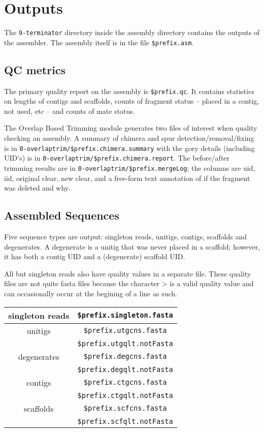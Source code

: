 \documentclass[twoside,11pt]{article}
\begin{document}
\section{Outputs}

The {\tt 9-terminator} directory inside the assembly directory
contains the outputs of the assembler.  The assembly itself is in the
file {\tt \$prefix.asm}.

\subsection{QC metrics}

The primary quality report on the assembly is {\tt \$prefix.qc}.  It
contains statistics on lengths of contigs and scaffolds, counts of
fragment status -- placed in a contig, not used, etc -- and counts of
mate status.

The Overlap Based Trimming module generates two files of interest
when quality checking an assembly.  A summary of chimera and spur
detection/removal/fixing is in {\tt 0-overlaptrim/\$prefix.chimera.summary} with the gory
details (including UID's) is in {\tt 0-overlaptrim/\$prefix.chimera.report}.  The
before/after trimming results are in {\tt 0-overlaptrim/\$prefix.mergeLog}; the columns are
uid, iid, original clear, new clear, and a free-form text annotation
of if the fragment was deleted and why.

\subsection{Assembled Sequences}

Five sequence types are output: singleton reads, unitigs, contigs,
scaffolds and degenerates.  A degenerate is a unitig that was never
placed in a scaffold; however, it has both a contig UID and a
(degenerate) scaffold UID.

All but singleton reads also have quality values in a separate file.
These quality files are not quite fasta files because the character > is a valid
quality value and can occasionally occur at the begining of a line as such.

\begin{center}
\begin{tabular}{|c|c|}
\hline
\hline
singleton reads      & {\tt \$prefix.singleton.fasta} \\
\hline
unitigs              & {\tt \$prefix.utgcns.fasta} \\
                     & {\tt \$prefix.utgqlt.notFasta} \\
\hline
degenerates          & {\tt \$prefix.degcns.fasta} \\
                     & {\tt \$prefix.degqlt.notFasta} \\
\hline
contigs              & {\tt \$prefix.ctgcns.fasta} \\
                     & {\tt \$prefix.ctgqlt.notFasta} \\
\hline
scaffolds            & {\tt \$prefix.scfcns.fasta} \\
                     & {\tt \$prefix.scfqlt.notFasta} \\
\hline
\end{tabular}
\end{center}
\end{document}

